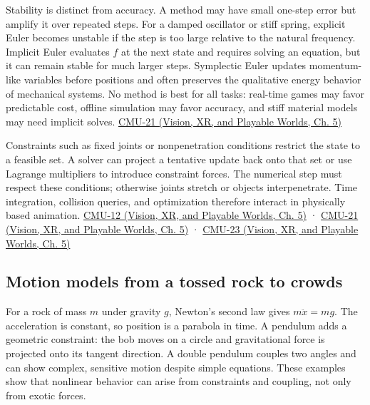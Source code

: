 Stability is distinct from accuracy. A method may have small one-step error but amplify it over repeated steps. For a damped oscillator or stiff spring, explicit Euler becomes unstable if the step is too large relative to the natural frequency. Implicit Euler evaluates \(f\) at the next state and requires solving an equation, but it can remain stable for much larger steps. Symplectic Euler updates momentum-like variables before positions and often preserves the qualitative energy behavior of mechanical systems. No method is best for all tasks: real-time games may favor predictable cost, offline simulation may favor accuracy, and stiff material models may need implicit solves. \href{../07-Vision-XR-and-Playable-Worlds/main.pdf\#nameddest=04-visual-computing-ii-ch036-cmu-21---dynamics-and-time-integration}{CMU-21 (Vision, XR, and Playable Worlds, Ch. 5)}

Constraints such as fixed joints or nonpenetration conditions restrict the state to a feasible set. A solver can project a tentative update back onto that set or use Lagrange multipliers to introduce constraint forces. The numerical step must respect these conditions; otherwise joints stretch or objects interpenetrate. Time integration, collision queries, and optimization therefore interact in physically based animation. \href{../07-Vision-XR-and-Playable-Worlds/main.pdf\#nameddest=04-visual-computing-ii-ch036-cmu-12---geometric-queries}{CMU-12 (Vision, XR, and Playable Worlds, Ch. 5)} · \href{../07-Vision-XR-and-Playable-Worlds/main.pdf\#nameddest=04-visual-computing-ii-ch036-cmu-21---dynamics-and-time-integration}{CMU-21 (Vision, XR, and Playable Worlds, Ch. 5)} · \href{../07-Vision-XR-and-Playable-Worlds/main.pdf\#nameddest=04-visual-computing-ii-ch036-cmu-23---physically-based-animation-and-pdes}{CMU-23 (Vision, XR, and Playable Worlds, Ch. 5)}

\subsection{Motion models from a tossed rock to crowds}\label{04-visual-computing-ii-ch029-motion-models-from-a-tossed-rock-to-crowds}

For a rock of mass \(m\) under gravity \(g\), Newton's second law gives \(m\ddot x=mg\). The acceleration is constant, so position is a parabola in time. A pendulum adds a geometric constraint: the bob moves on a circle and gravitational force is projected onto its tangent direction. A double pendulum couples two angles and can show complex, sensitive motion despite simple equations. These examples show that nonlinear behavior can arise from constraints and coupling, not only from exotic forces.

